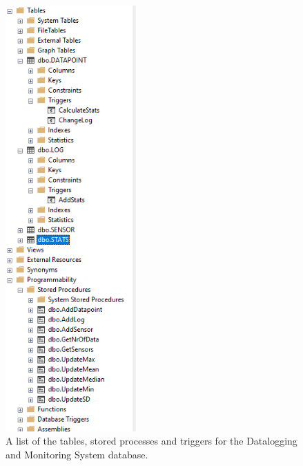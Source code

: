 \documentclass[11pt, A4paper, english]{article}
\begin{document}
{\begin{figure}
\includegraphics[width=5cm]{Images/ProcessesAndTriggers}
\caption{A list of the tables, stored processes and triggers for the Datalogging and Monitoring System database.}
\label{PandT}
			\end{figure}
		
}
\end{document}
